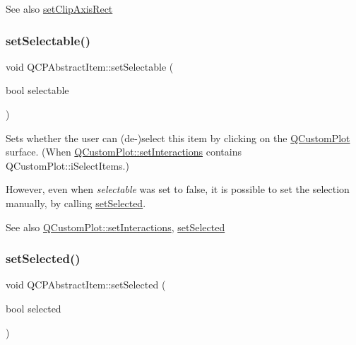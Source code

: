 \begin{DoxySeeAlso}{See also}
\hyperlink{class_q_c_p_abstract_item_a7dc75fcbcd10206fe0b75d757ea7a347}{set\+Clip\+Axis\+Rect} 
\end{DoxySeeAlso}
\mbox{\label{class_q_c_p_abstract_item_a8a8e32a55bc478b849756a78c2d87fd2}} 
\subsubsection{\texorpdfstring{set\+Selectable()}{setSelectable()}}
{\footnotesize\ttfamily void Q\+C\+P\+Abstract\+Item\+::set\+Selectable (\begin{DoxyParamCaption}\item[{bool}]{selectable }\end{DoxyParamCaption})}

Sets whether the user can (de-\/)select this item by clicking on the \hyperlink{class_q_custom_plot}{Q\+Custom\+Plot} surface. (When \hyperlink{class_q_custom_plot_a5ee1e2f6ae27419deca53e75907c27e5}{Q\+Custom\+Plot\+::set\+Interactions} contains Q\+Custom\+Plot\+::i\+Select\+Items.)

However, even when {\itshape selectable} was set to false, it is possible to set the selection manually, by calling \hyperlink{class_q_c_p_abstract_item_a203de94ad586cc44d16c9565f49d3378}{set\+Selected}.

\begin{DoxySeeAlso}{See also}
\hyperlink{class_q_custom_plot_a5ee1e2f6ae27419deca53e75907c27e5}{Q\+Custom\+Plot\+::set\+Interactions}, \hyperlink{class_q_c_p_abstract_item_a203de94ad586cc44d16c9565f49d3378}{set\+Selected} 
\end{DoxySeeAlso}
\mbox{\label{class_q_c_p_abstract_item_a203de94ad586cc44d16c9565f49d3378}} 
\subsubsection{\texorpdfstring{set\+Selected()}{setSelected()}}
{\footnotesize\ttfamily void Q\+C\+P\+Abstract\+Item\+::set\+Selected (\begin{DoxyParamCaption}\item[{bool}]{selected }\end{DoxyParamCaption})}

